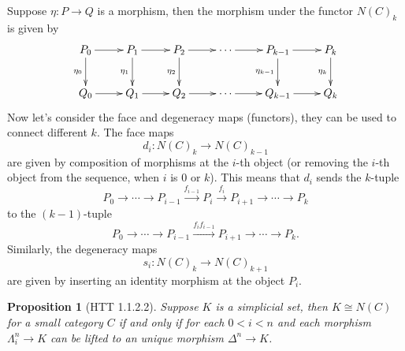 \documentclass[11pt]{article}
\theoremstyle{definition}
\theoremstyle{plain}
\newtheorem{pro}[para]{Proposition}
\begin{document}
Suppose $\eta:P\to Q$ is a morphism, then the morphism under the functor $N(C)_k$ is given by
\[
    \xymatrix{
        P_0\ar[r]\ar[d]_{\eta_0} & P_1\ar[r]\ar[d]_{\eta_1} & P_2\ar[r]\ar[d]_{\eta_2} & \cdots \ar[r] & P_{k-1}\ar[r]\ar[d]_{\eta_{k-1}} & P_k\ar[d]_{\eta_k}\\
        Q_0\ar[r] & Q_1\ar[r] & Q_2\ar[r] & \cdots \ar[r] & Q_{k-1}\ar[r] & Q_k
    }
\]
Now let's consider the face and degeneracy maps (functors), they can be used to connect different $k$. The face maps 
\[
     d_{i}\colon N(C)_{k}\to N(C)_{k-1}
\]
are given by composition of morphisms at the $i$-th object (or removing the $i$-th object from the sequence, when $i$ is $0$ or $k$). This means that $d_i$ sends the $k$-tuple 
\[P_{0}\to \cdots \to P_{i-1}\xrightarrow{f_{i-1}} P_{i}\xrightarrow{f_{i}} P_{i+1}\to \cdots \to P_{k}\]
to the $(k-1)$-tuple 
\[P_{0}\to \cdots \to P_{i-1}\xrightarrow{f_if_{i-1}} P_{i+1}\to \cdots \to P_{k}.\]
Similarly, the degeneracy maps 
\[s_{i}:N(C)_{k}\to N(C)_{k+1}\] 
are given by inserting an identity morphism at the object $P_i$. 

\begin{pro}[HTT 1.1.2.2]
    Suppose $K$ is a simplicial set, then $K\cong N(C)$ for a small category $C$ if and only if for each $0<i<n$ and each morphism $\Lambda_i^n\to K$ can be lifted to an unique morphism $\Delta^n \to K$.
\end{pro}
\end{document}
